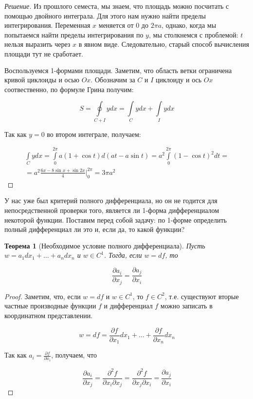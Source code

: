\documentclass[a5paper]{article}
\newcounter{through}
\theoremstyle{plain}
\newtheorem{theorem}[through]{Теорема}
\theoremstyle{definition}
\numberwithin{through}{section}
\numberwithin{equation}{section}
\begin{document}
\begin{proof}[Решение]
	Из прошлого семеста, мы знаем, что площадь можно посчитать с помощью двойного интеграла. Для этого нам нужно найти пределы интегрирования. Переменная $x$ меняется от $0$ до $2\pi a$, однако, когда мы попытаемся найти пределы интегрирования по $y$, мы столкнемся с проблемой: $t$ нельзя выразить через $x$ в явном виде. Следовательно, старый способ вычисления площади тут не сработает.
	
	Воспользуемся 1-формами площади. Заметим, что область ветки ограничена кривой циклоиды и осью $Ox$. Обозначим за $C$ и $I$ циклоиду и ось $Ox$ соотвественно, по формуле Грина получим:
	
	\begin{equation*}
		S = \oint\limits_{C + I}ydx =\int\limits_{C}ydx + \int\limits_{I}ydx
	\end{equation*}

	Так как $y = 0$ во втором интеграле, получаем:
	
	\begin{multline*}
	\int\limits_{C}ydx = \int\limits_{0}^{2\pi}a(1+\cos t) d(at - a\sin t) = a^2 \int\limits_{0}^{2\pi} (1-\cos t)^2dt = \\= a^2 \frac{6x - 8 \sin x + \sin 2x}{4} \bigg|_0^{2\pi} = 3 \pi a^2
	\end{multline*}
\end{proof}

У нас уже был критерий полного дифференциала, но он не годится для непосредственной проверки того, является ли 1-форма дифференциалом некоторой функции. Поставим перед собой задачу: по 1-форме определить полный дифференциал ли это и, если да, то какой функции?

\begin{theorem}[Необходимое условие полного дифференциала]
	Пусть $w = a_1 dx_1 + \ldots + a_n dx_n$ и $w \in C^1$. Тогда, если $w = df$, то 
	
	\begin{equation*}
		\frac{\partial a_i}{\partial x_j} = \frac{\partial a_j}{\partial x_i}
	\end{equation*}
\end{theorem}

\begin{proof}
	Заметим, что, если $w = df$ и $w \in C^1$, то $f \in C^2$, т.е. существуют вторые частные производные функции $f$ и дифференциал $f$ можно записать в координатном представлении.
	
	\begin{equation*}
		w = df = \frac{\partial f}{\partial x_1} dx_1 + \ldots + \frac{\partial f}{\partial x_n} dx_n
	\end{equation*}
	
	Так как $a_i = \frac{\partial f}{\partial x_i}$, получаем, что
	
	\begin{equation*}
		\frac{\partial a_i}{\partial x_j} = \frac{\partial^2 f}{\partial x_i \partial x_j} = \frac{\partial^2 f}{\partial x_j \partial x_i} = \frac{\partial a_j}{\partial x_i}
	\end{equation*}
\end{proof}
\end{document}
